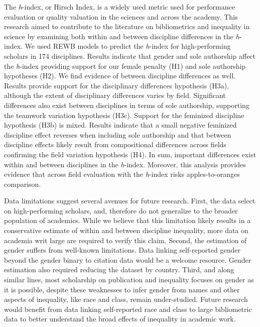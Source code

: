 \documentclass[
  10pt,
  letterpaper,
]{article}
\begin{document}
The \emph{h}-index, or Hirsch Index, is a widely used metric used for
performance evaluation or quality valuation in the sciences and across
the academy. This research aimed to contribute to the literature on
bibliometrics and inequality in science by examining both within and
between discipline differences in the \emph{h}-index. We used REWB
models to predict the \emph{h}-index for high-performing scholars in 174
disciplines. Results indicate that gender and sole authorship affect the
\emph{h}-index providing support for our female penalty (H1) and sole
authorship hypotheses (H2). We find evidence of between discipline
differences as well. Results provide support for the disciplinary
differences hypothesis (H3a), although the extent of disciplinary
differences varies by field. Significant differences also exist between
disciplines in terms of sole authorship, supporting the teamwork
variation hypothesis (H3c). Support for the feminized discipline
hypothesis (H3b) is mixed. Results indicate that a small negative
feminized discipline effect reverses when including sole authorship and
that between discipline effects likely result from compositional
differences across fields confirming the field variation hypothesis
(H4). In sum, important differences exist within and between disciplines
in the \emph{h}-index. Moreover, this analysis provides evidence that
across field evaluation with the \emph{h}-index risks apples-to-oranges
comparison.

Data limitations suggest several avenues for future research. First, the
data select on high-performing scholars, and, therefore do not
generalize to the broader population of academics. While we believe that
this limitation likely results in a conservative estimate of within and
between discipline inequality, more data on academia writ large are
required to verify this claim. Second, the estimation of gender suffers
from well-known limitations. Data linking self-reported gender beyond
the gender binary to citation data would be a welcome resource. Gender
estimation also required reducing the dataset by country. Third, and
along similar lines, most scholarship on publication and inequality
focuses on gender as it is possible, despite these weaknesses to infer
gender from names and other aspects of inequality, like race and class,
remain under-studied. Future research would benefit from data linking
self-reported race and class to large bibliometric data to better
understand the broad effects of inequality in academic work.
\end{document}
